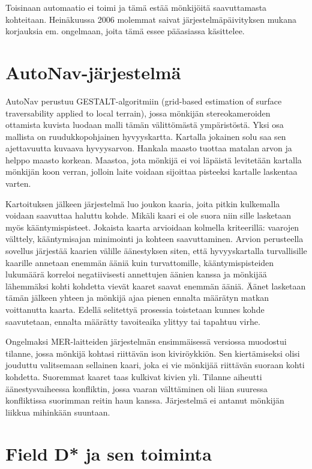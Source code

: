 \documentclass[finnish]{tktltiki2}
\theoremstyle{definition}
\theoremstyle{remark}
\begin{document}
Toisinaan automaatio ei toimi ja tämä estää mönkijöitä saavuttamasta kohteitaan. Heinäkuussa 2006 molemmat saivat järjestelmäpäivityksen mukana korjauksia em. ongelmaan, joita tämä essee pääasiassa käsittelee.

\section{AutoNav-järjestelmä}

AutoNav perustuu GESTALT-algoritmiin (grid-based estimation of surface traversability applied to local terrain), jossa mönkijän stereokameroiden ottamista kuvista luodaan malli tämän välittömästä ympäristöstä. Yksi osa mallista on ruudukkopohjainen hyvyyskartta. Kartalla jokainen solu saa sen ajettavuutta kuvaava hyvyysarvon. Hankala maasto tuottaa matalan arvon ja helppo maasto korkean. Maastoa, jota mönkijä ei voi läpäistä levitetään kartalla mönkijän koon verran, jolloin laite voidaan sijoittaa pisteeksi kartalle laskentaa varten.
	
Kartoituksen jälkeen järjestelmä luo joukon kaaria, joita pitkin kulkemalla voidaan saavuttaa haluttu kohde. Mikäli kaari ei ole suora niin sille lasketaan myös kääntymispisteet. Jokaista kaarta arvioidaan kolmella kriteerillä: vaarojen välttely, kääntymisajan minimointi ja kohteen saavuttaminen. Arvion perusteella sovellus järjestää kaarien välille äänestyksen siten, että hyvyyskartalla turvallisille kaarille annetaan enemmän ääniä kuin turvattomille, kääntymispisteiden lukumäärä korreloi negatiivisesti annettujen äänien kanssa ja mönkijää lähemmäksi kohti kohdetta vievät kaaret saavat enemmän ääniä. Äänet lasketaan tämän jälkeen yhteen ja mönkijä ajaa pienen ennalta määrätyn matkan voittanutta kaarta. Edellä selitettyä prosessia toistetaan kunnes kohde saavutetaan, ennalta määrätty tavoiteaika ylittyy tai tapahtuu virhe.
	
Ongelmaksi MER-laitteiden järjestelmän ensimmäisessä versiossa muodostui tilanne, jossa mönkijä kohtasi riittävän ison kiviröykkiön. Sen kiertämiseksi olisi jouduttu valitsemaan sellainen kaari, joka ei vie mönkijää riittävän suoraan kohti kohdetta. Suoremmat kaaret taas kulkivat kivien yli. Tilanne aiheutti äänestysvaiheessa konfliktin, jossa vaaran välttäminen oli liian suuressa konfliktissa suorimman reitin haun kanssa. Järjestelmä ei antanut mönkijän liikkua mihinkään suuntaan.

\section{Field D* ja sen toiminta}
\end{document}
